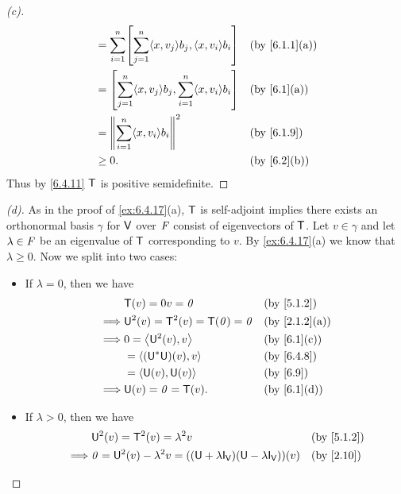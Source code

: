 \begin{proof}[(c)]
\begin{align*}
		 & = \sum_{i = 1}^n \br{\sum_{j = 1}^n \inn{x, v_j} b_j, \inn{x, v_i} b_i}                                &  & \by{6.1.1}[a]          \\
		 & = \br{\sum_{j = 1}^n \inn{x, v_j} b_j, \sum_{i = 1}^n \inn{x, v_i} b_i}                                &  & \by{6.1}[a]            \\
		 & = \norm{\sum_{i = 1}^n \inn{x, v_i} b_i}^2                                                             &  & \by{6.1.9}             \\
		 & \geq 0.                                                                                                &  & \by{6.2}[b]
	\end{align*}
	Thus by \cref{6.4.11} \(\mathsf{T}\) is positive semidefinite.
\end{proof}

\begin{proof}[(d)]
	As in the proof of \cref{ex:6.4.17}(a), \(\mathsf{T}\) is self-adjoint implies there exists an orthonormal basis \(\gamma\) for \(\mathsf{V}\) over \(\mathit{F}\) consist of eigenvectors of \(\mathsf{T}\).
	Let \(v \in \gamma\) and let \(\lambda \in \mathit{F}\) be an eigenvalue of \(\mathsf{T}\) corresponding to \(v\).
	By \cref{ex:6.4.17}(a) we know that \(\lambda \geq 0\).
	Now we split into two cases:
	\begin{itemize}
		\item If \(\lambda = 0\), then we have
		      \begin{align*}
			               & \T(v) = 0v = \zv                  &  & \by{5.1.2}    \\
			      \implies & \U^2(v) = \T^2(v) = \T(\zv) = \zv &  & \by{2.1.2}[a] \\
			      \implies & 0 = \inn{\U^2(v), v}              &  & \by{6.1}[c]   \\
			               & = \inn{(\U^* \U)(v), v}           &  & \by{6.4.8}    \\
			               & = \inn{\U(v), \U(v)}              &  & \by{6.9}      \\
			      \implies & \U(v) = \zv = \T(v).              &  & \by{6.1}[d]
		      \end{align*}
		\item If \(\lambda > 0\), then we have
		      \begin{align*}
			               & \U^2(v) = \T^2(v) = \lambda^2 v                                                                         &  & \by{5.1.2} \\
			      \implies & \zv = \U^2(v) - \lambda^2 v = ((\U + \lambda \IT[\V]) (\U - \lambda \IT[\V]))(v)                        &  & \by{2.10}  \\

\end{align*}
\end{itemize}
\end{proof}
